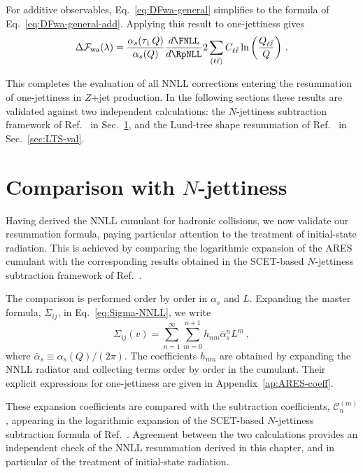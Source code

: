 For additive observables, Eq.~\eqref{eq:DFwa-general} simplifies to the
formula of Eq.~\eqref{eq:DFwa-general-add}. Applying this result
to one-jettiness gives
 \begin{equation}
  \label{eq:DFwa-tau_one}
    \Delta \mathcal{F}_{\rm wa}(\lambda) =  \frac{\alpha_s(\tau_1\,Q)}{\alpha_s(Q)}\frac{d\FNLL}{d\RpNLL}2\sum_{(\ell\bar\ell)} C_{\ell\bar\ell}\ln\left(\frac{Q_{\ell\bar\ell}}{Q}\right)\,. 
  \end{equation}
  
This completes the evaluation of all NNLL corrections entering the
resummation of one-jettiness in $Z$+jet production. In the following sections these results are validated against two
independent calculations: the $N$-jettiness subtraction framework of
Ref.~\cite{Gaunt:2015pea} in Sec.~\ref{subsec:N-jet-SCET-val}, and the
Lund-tree shape resummation of Ref.~\cite{vanBeekveld:2025zjh} in
Sec.~\ref{sec:LTS-val}.


 \section{Comparison with $N$-jettiness}
 \label{subsec:N-jet-SCET-val}
 
 Having derived the NNLL cumulant for hadronic collisions, we now validate
our resummation formula, paying particular attention to the treatment of
initial-state radiation. This is achieved by comparing the logarithmic
expansion of the \textsc{ARES} cumulant with the corresponding results
obtained in the SCET-based $N$-jettiness subtraction framework of
Ref.~\cite{Gaunt:2015pea}.

The comparison is performed order by order in $\alpha_s$ and $L$. Expanding the master formula,
$\Sigma_{ij}$, in Eq.~\eqref{eq:Sigma-NNLL}, we write~\cite{Banfi:2004yd}
 \begin{equation}
\label{eq:sig-coeff}
	\Sigma_{ij}(v)=\sum_{n=1}^{\infty}\sum_{m=0}^{n+1} h_{nm}\bar{\alpha}^n_sL^m\,,
\end{equation}
where $\bar{\alpha}_s\equiv\alpha_s(Q)/(2\pi)$. The coefficients
$h_{nm}$ are obtained by expanding the NNLL radiator and collecting
terms order by order in the cumulant. Their explicit expressions for
one-jettiness are given in Appendix~\ref{ap:ARES-coeff}.

These expansion coefficients are compared with the subtraction coefficients,
$\mathcal{C}_n^{(m)}$, appearing in the logarithmic expansion of the
SCET-based $N$-jettiness subtraction formula of
Ref.~\cite{Gaunt:2015pea}. Agreement between the two calculations
provides an independent check of the NNLL resummation derived in this
chapter, and in particular of the treatment of initial-state radiation.

